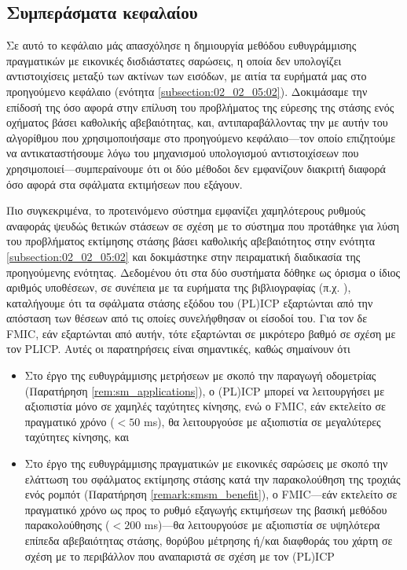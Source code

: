 \subsection{Συμπεράσματα κεφαλαίου}
\label{subsection:02_03_05:01}

Σε αυτό το κεφάλαιο μάς απασχόλησε η δημιουργία μεθόδου ευθυγράμμισης
πραγματικών με εικονικές δισδιάστατες σαρώσεις, η οποία δεν υπολογίζει
αντιστοιχίσεις μεταξύ των ακτίνων των εισόδων, με αιτία τα ευρήματά μας στο
προηγούμενο κεφάλαιο (ενότητα \ref{subsection:02_02_05:02}). Δοκιμάσαμε την
επίδοσή της όσο αφορά στην επίλυση του προβλήματος της εύρεσης της στάσης ενός
οχήματος βάσει καθολικής αβεβαιότητας, και, αντιπαραβάλλοντας την με αυτήν του
αλγορίθμου που χρησιμοποιήσαμε στο προηγούμενο κεφάλαιο---τον οποίο επιζητούμε
να αντικαταστήσουμε λόγω του μηχανισμού υπολογισμού αντιστοιχίσεων που
χρησιμοποιεί---συμπεραίνουμε ότι οι δύο μέθοδοι δεν εμφανίζουν διακριτή διαφορά
όσο αφορά στα σφάλματα εκτιμήσεων που εξάγουν.

Πιο συγκεκριμένα, το προτεινόμενο σύστημα εμφανίζει χαμηλότερους ρυθμούς
αναφοράς ψευδώς θετικών στάσεων σε σχέση με το σύστημα που προτάθηκε για λύση
του προβλήματος εκτίμησης στάσης βάσει καθολικής αβεβαιότητος στην ενότητα
\ref{subsection:02_02_05:02} και δοκιμάστηκε στην πειραματική διαδικασία της
προηγούμενης ενότητας. Δεδομένου ότι στα δύο συστήματα δόθηκε ως όρισμα ο ίδιος
αριθμός υποθέσεων, σε συνέπεια με τα ευρήματα της βιβλιογραφίας (π.χ.
\cite{Olson2009a,bernreiter2021phaser}), καταλήγουμε ότι τα σφάλματα στάσης
εξόδου του (PL)ICP εξαρτώνται από την απόσταση των θέσεων από τις οποίες
συνελήφθησαν οι είσοδοί του. Για τον δε FMIC, εάν εξαρτώνται από αυτήν, τότε
εξαρτώνται σε μικρότερο βαθμό σε σχέση με τον PLICP. Αυτές οι παρατηρήσεις είναι
σημαντικές, καθώς σημαίνουν ότι

\begin{itemize}
  \item Στο έργο της ευθυγράμμισης μετρήσεων με σκοπό την παραγωγή οδομετρίας
        (Παρατήρηση \ref{rem:sm_applications}), ο (PL)ICP μπορεί να λειτουργήσει
        με αξιοπιστία μόνο σε χαμηλές ταχύτητες κίνησης, ενώ ο FMIC, εάν
        εκτελείτο σε πραγματικό χρόνο ($< 50$ ms), θα λειτουργούσε με αξιοπιστία
        σε μεγαλύτερες ταχύτητες κίνησης, και
  \item Στο έργο της ευθυγράμμισης πραγματικών με εικονικές σαρώσεις με σκοπό
        την ελάττωση του σφάλματος εκτίμησης στάσης κατά την παρακολούθηση
        της τροχιάς ενός ρομπότ (Παρατήρηση \ref{remark:smsm_benefit}), ο
        FMIC---εάν εκτελείτο σε πραγματικό χρόνο ως προς το ρυθμό εξαγωγής
        εκτιμήσεων της βασική μεθόδου παρακολούθησης ($< 200$ ms)---θα
        λειτουργούσε με αξιοπιστία σε υψηλότερα επίπεδα αβεβαιότητας στάσης,
        θορύβου μέτρησης ή/και διαφθοράς του χάρτη σε σχέση με το περιβάλλον
        που αναπαριστά σε σχέση με τον (PL)ICP
\end{itemize}

